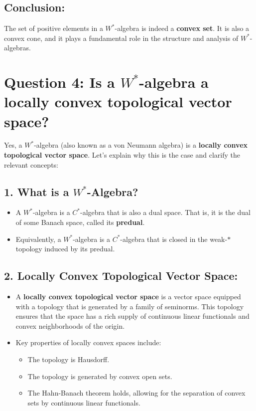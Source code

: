 \documentclass{article}
\begin{document}
\subsection*{Conclusion:}
The set of positive elements in a \( W^* \)-algebra is indeed a \textbf{convex set}. It is also a convex cone, and it plays a fundamental role in the structure and analysis of \( W^* \)-algebras.

\section*{Question 4: Is a \( W^* \)-algebra a locally convex topological vector space?}

Yes, a \( W^* \)-algebra (also known as a von Neumann algebra) is a \textbf{locally convex topological vector space}. Let's explain why this is the case and clarify the relevant concepts:

\subsection*{1. What is a \( W^* \)-Algebra?}
\begin{itemize}
    \item A \( W^* \)-algebra is a \( C^* \)-algebra that is also a dual space. That is, it is the dual of some Banach space, called its \textbf{predual}.
    \item Equivalently, a \( W^* \)-algebra is a \( C^* \)-algebra that is closed in the weak-\( * \) topology induced by its predual.
\end{itemize}

\subsection*{2. Locally Convex Topological Vector Space:}
\begin{itemize}
    \item A \textbf{locally convex topological vector space} is a vector space equipped with a topology that is generated by a family of seminorms. This topology ensures that the space has a rich supply of continuous linear functionals and convex neighborhoods of the origin.
    \item Key properties of locally convex spaces include:
    \begin{itemize}
        \item The topology is Hausdorff.
        \item The topology is generated by convex open sets.
        \item The Hahn-Banach theorem holds, allowing for the separation of convex sets by continuous linear functionals.
    \end{itemize}
\end{itemize}
\end{document}
